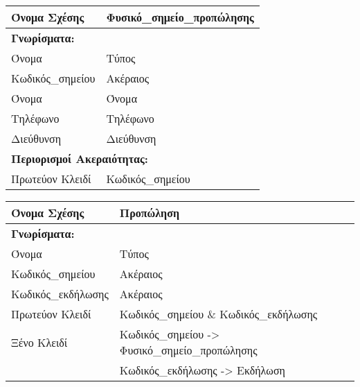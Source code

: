 \begin{tabular}{|p{6cm}|p{8cm}|}
  \hline
  Όνομα Σχέσης    & Φυσικό\_σημείο\_προπώλησης               \\ \hline
  \multicolumn{2}{|l|}{\textbf{Γνωρίσματα:}}               \\ \hline
  Όνομα           & Τύπος                                  \\ \hline
  Κωδικός\_σημείου & Ακέραιος                               \\ \hline
  Όνομα           & Όνομα                                  \\ \hline
  Τηλέφωνο        & Τηλέφωνο                               \\ \hline
  Διεύθυνση       & Διεύθυνση                              \\ \hline
  \multicolumn{2}{|l|}{\textbf{Περιορισμοί Ακεραιότητας:}} \\ \hline
  Πρωτεύον Κλειδί & Κωδικός\_σημείου                        \\ \hline
\end{tabular}

\begin{tabular}{|p{6cm}|p{8cm}|}
  \hline
  Όνομα Σχέσης      & Προπώληση                            \\ \hline
  \multicolumn{2}{|l|}{\textbf{Γνωρίσματα:}}               \\ \hline
  Όνομα             & Τύπος                                \\ \hline
  Κωδικός\_σημείου   & Ακέραιος                             \\ \hline
  Κωδικός\_εκδήλωσης & Ακέραιος                             \\ \hline
  Πρωτεύον Κλειδί   & Κωδικός\_σημείου \& Κωδικός\_εκδήλωσης \\ \hline
  Ξένο Κλειδί       & Κωδικός\_σημείου -> Φυσικό\_σημείο\_προπώλησης
                                                           \\ \hline
                    & Κωδικός\_εκδήλωσης -> Εκδήλωση        \\ \hline
\end{tabular}


